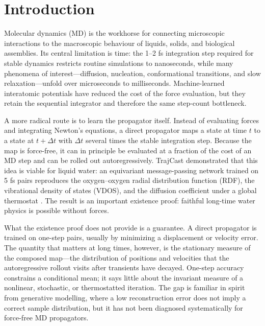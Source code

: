 \section{Introduction}

Molecular dynamics (MD) is the workhorse for connecting microscopic interactions to the
macroscopic behaviour of liquids, solids, and biological assemblies. Its central limitation is
time: the 1--2 fs integration step required for stable dynamics restricts routine simulations to
nanoseconds, while many phenomena of interest---diffusion, nucleation, conformational transitions,
and slow relaxation---unfold over microseconds to milliseconds. Machine-learned interatomic
potentials have reduced the cost of the force evaluation, but they retain the sequential
integrator and therefore the same step-count bottleneck.

A more radical route is to learn the propagator itself. Instead of evaluating forces and
integrating Newton's equations, a direct propagator maps a state at time \(t\) to a state at
\(t+\Delta t\) with \(\Delta t\) several times the stable integration step. Because the map is
force-free, it can in principle be evaluated at a fraction of the cost of an MD step and can be
rolled out autoregressively. TrajCast demonstrated that this idea is viable for liquid water: an
equivariant message-passing network trained on 5 fs pairs reproduces the oxygen--oxygen radial
distribution function (RDF), the vibrational density of states (VDOS), and the diffusion
coefficient under a global thermostat \cite{trajcast}. The result is an important existence proof:
faithful long-time water physics is possible without forces.

What the existence proof does not provide is a guarantee. A direct propagator is trained on
one-step pairs, usually by minimizing a displacement or velocity error. The quantity that matters
at long times, however, is the stationary measure of the composed map---the distribution of
positions and velocities that the autoregressive rollout visits after transients have decayed.
One-step accuracy constrains a conditional mean; it says little about the invariant measure of a
nonlinear, stochastic, or thermostatted iteration. The gap is familiar in spirit from generative
modelling, where a low reconstruction error does not imply a correct sample distribution, but it
has not been diagnosed systematically for force-free MD propagators.

